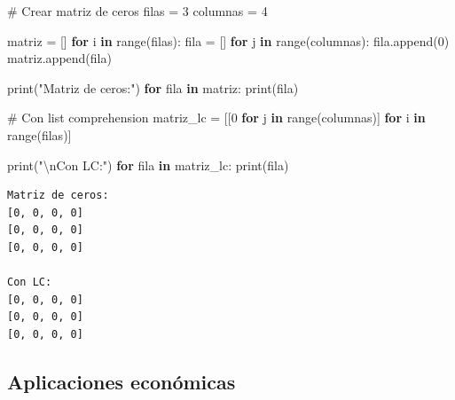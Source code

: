 \documentclass[
  doc,
  floatsintext,
  longtable,
  a4paper,
  nolmodern,
  notxfonts,
  notimes,
  12pt,
  colorlinks=true,linkcolor=blue,citecolor=blue,urlcolor=blue]{apa7}
\newenvironment{Shaded}{\begin{snugshade}}{\end{snugshade}}
\newcommand{\BuiltInTok}[1]{\textcolor[rgb]{0.00,0.23,0.31}{#1}}
\newcommand{\CharTok}[1]{\textcolor[rgb]{0.13,0.47,0.30}{#1}}
\newcommand{\CommentTok}[1]{\textcolor[rgb]{0.37,0.37,0.37}{#1}}
\newcommand{\ControlFlowTok}[1]{\textcolor[rgb]{0.00,0.23,0.31}{\textbf{#1}}}
\newcommand{\DecValTok}[1]{\textcolor[rgb]{0.68,0.00,0.00}{#1}}
\newcommand{\KeywordTok}[1]{\textcolor[rgb]{0.00,0.23,0.31}{\textbf{#1}}}
\newcommand{\NormalTok}[1]{\textcolor[rgb]{0.00,0.23,0.31}{#1}}
\newcommand{\OperatorTok}[1]{\textcolor[rgb]{0.37,0.37,0.37}{#1}}
\newcommand{\StringTok}[1]{\textcolor[rgb]{0.13,0.47,0.30}{#1}}
\begin{document}
\begin{Shaded}
\begin{Highlighting}[]
\CommentTok{\# Crear matriz de ceros}
\NormalTok{filas }\OperatorTok{=} \DecValTok{3}
\NormalTok{columnas }\OperatorTok{=} \DecValTok{4}

\NormalTok{matriz }\OperatorTok{=}\NormalTok{ []}
\ControlFlowTok{for}\NormalTok{ i }\KeywordTok{in} \BuiltInTok{range}\NormalTok{(filas):}
\NormalTok{    fila }\OperatorTok{=}\NormalTok{ []}
    \ControlFlowTok{for}\NormalTok{ j }\KeywordTok{in} \BuiltInTok{range}\NormalTok{(columnas):}
\NormalTok{        fila.append(}\DecValTok{0}\NormalTok{)}
\NormalTok{    matriz.append(fila)}

\BuiltInTok{print}\NormalTok{(}\StringTok{"Matriz de ceros:"}\NormalTok{)}
\ControlFlowTok{for}\NormalTok{ fila }\KeywordTok{in}\NormalTok{ matriz:}
    \BuiltInTok{print}\NormalTok{(fila)}

\CommentTok{\# Con list comprehension}
\NormalTok{matriz\_lc }\OperatorTok{=}\NormalTok{ [[}\DecValTok{0} \ControlFlowTok{for}\NormalTok{ j }\KeywordTok{in} \BuiltInTok{range}\NormalTok{(columnas)] }\ControlFlowTok{for}\NormalTok{ i }\KeywordTok{in} \BuiltInTok{range}\NormalTok{(filas)]}

\BuiltInTok{print}\NormalTok{(}\StringTok{"}\CharTok{\textbackslash{}n}\StringTok{Con LC:"}\NormalTok{)}
\ControlFlowTok{for}\NormalTok{ fila }\KeywordTok{in}\NormalTok{ matriz\_lc:}
    \BuiltInTok{print}\NormalTok{(fila)}
\end{Highlighting}
\end{Shaded}

\begin{verbatim}
Matriz de ceros:
[0, 0, 0, 0]
[0, 0, 0, 0]
[0, 0, 0, 0]

Con LC:
[0, 0, 0, 0]
[0, 0, 0, 0]
[0, 0, 0, 0]
\end{verbatim}

\subsection{Aplicaciones económicas}\label{aplicaciones-econuxf3micas-3}
\end{document}
